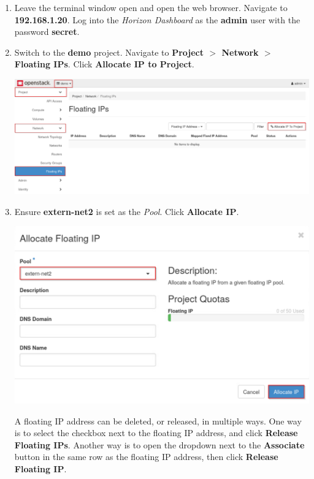 \documentclass[letterpaper, 12pt]{article}
\begin{document}
\begin{enumerate}
    \item Leave the terminal window open and open the web browser.
    Navigate to \textbf{192.168.1.20}.
    Log into the \textit{Horizon Dashboard} as the \textbf{admin} user with the password \textbf{secret}.

    \item Switch to the \textbf{demo} project.
    Navigate to \textbf{Project $>$ Network $>$ Floating IPs}.
    Click \textbf{Allocate IP to Project}.

    \begin{center}
        \includegraphics[width=\linewidth]{images/part3/step4.png}
    \end{center}

    \item Ensure \textbf{extern-net2} is set as the \textit{Pool}.
    Click \textbf{Allocate IP}.

    \begin{center}
        \includegraphics[width=\linewidth]{images/part3/step5.png}
    \end{center}

    \begin{tipbox}
        A floating IP address can be deleted, or released, in multiple ways.
        One way is to select the checkbox next to the floating IP address, and click \textbf{Release Floating IPs}.
        Another way is to open the dropdown next to the \textbf{Associate} button in the same row as the floating IP address, then click \textbf{Release Floating IP}.
    \end{tipbox}


\end{enumerate}
\end{document}
